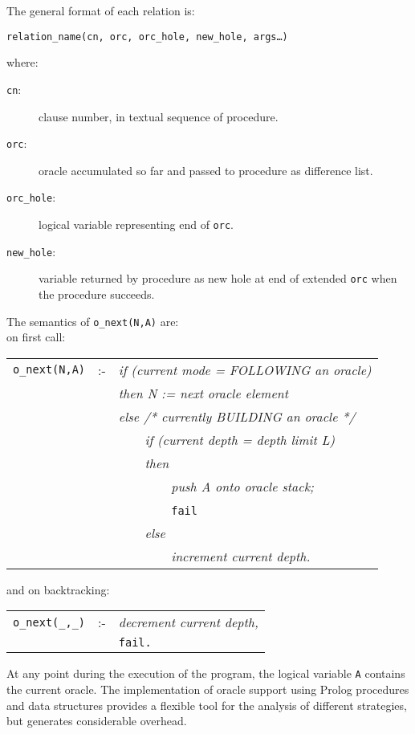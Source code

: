 The general format of each relation is:\\
\centerline{\texttt{relation\_{}name(cn, orc, orc\_{}hole, new\_{}hole, args\ldots)}}
where:
\begin{description}
\item[\texttt{cn}:]{ clause number, in textual sequence of procedure.}
\item[\texttt{orc}:]{ oracle accumulated so far and passed to procedure as
  difference list.}
\item[\texttt{orc\_{}hole}:]{ logical variable representing end of \texttt{orc}.}
\item[\texttt{new\_{}hole}:]{ variable returned by procedure as new hole at end
  of extended \texttt{orc} when the procedure succeeds.}
\end{description}
The semantics of \texttt{o\_{}next(N,A)} are:\\
on first call:\\
\begin{tabular}{l l l}
\texttt{o\_{}next(N,A)} & :- & \textit{if (current mode = FOLLOWING an oracle)}\\
                        &    & \textit{then N := next oracle element}\\
                        &    & \textit{else /* currently BUILDING an oracle */}\\
                        &    & \textit{~~~~if (current depth = depth limit L)}\\
                        &    & \textit{~~~~then}\\
                        &    & \textit{~~~~~~~~push A onto oracle stack;}\\
                        &    & \textit{~~~~~~~~}\texttt{fail}\\
                        &    & \textit{~~~~else}\\
                        &    & \textit{~~~~~~~~increment current depth.}
\end{tabular}

and on backtracking:\\
\begin{tabular}{l l l}
\texttt{o\_{}next(\_{},\_{})} & :- & \textit{decrement current depth,}\\
                              &    & \texttt{fail.}
\end{tabular}

At any point during the execution of the program, the logical variable
\texttt{A} contains the current oracle.
The implementation of oracle support using Prolog procedures and
data structures provides a flexible tool for
the analysis of different strategies, but generates considerable overhead.

